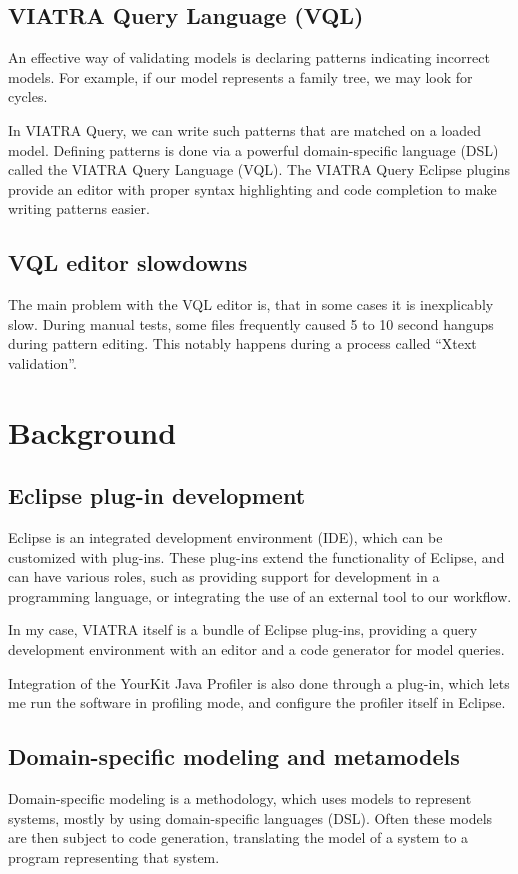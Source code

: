 \documentclass[11pt,a4paper,oneside]{report}
\begin{document}
\pagebreak
\section{VIATRA Query Language (VQL)}
An effective way of validating models is declaring patterns indicating incorrect
models. For example, if our model represents a family tree, we may look for
cycles.

In VIATRA Query, we can write such patterns that are matched on a loaded model.
Defining patterns is done via a powerful domain-specific language (DSL) called
the VIATRA Query Language (VQL). The VIATRA Query Eclipse plugins provide an
editor with proper syntax highlighting and code completion to make writing
patterns easier.

\section{VQL editor slowdowns}
The main problem with the VQL editor is, that in some cases it is inexplicably
slow. During manual tests, some files frequently caused 5 to 10 second hangups
during pattern editing. This notably happens during a process called ``Xtext
validation''.

\chapter{Background}

\section{Eclipse plug-in development}
Eclipse is an integrated development environment (IDE), which can be customized
with plug-ins. These plug-ins extend the functionality of Eclipse, and can have
various roles, such as providing support for development in a programming
language, or integrating the use of an external tool to our workflow.

In my case, VIATRA itself is a bundle of Eclipse plug-ins, providing a query
development environment with an editor and a code generator for model
queries\cite{viatra}.

Integration of the YourKit Java Profiler is also done through a plug-in, which
lets me run the software in profiling mode, and configure the profiler itself
in Eclipse.

\section{Domain-specific modeling and metamodels}
Domain-specific modeling is a methodology, which uses models to represent
systems, mostly by using domain-specific languages (DSL). Often these models
are then subject to code generation, translating the model of a system to a
program representing that system.
\end{document}
